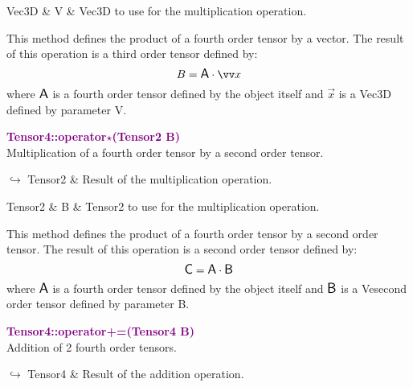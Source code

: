 \begin{tcolorbox}[width=\textwidth,myArgs,tabularx={ll|R}]
Vec3D & V & Vec3D to use for the multiplication operation.
\end{tcolorbox}

This method defines the product of a fourth order tensor by a vector.
The result of this operation is a third order tensor defined by:
\begin{equation*}
B = \A \cdot \overrightarrow{x}
\end{equation*}
where $\mbox{\large\ensuremath{\mathsf{A}}}$ is a fourth order tensor defined by the object itself and $\overrightarrow{x}$ is a Vec3D defined by parameter V.

\textcolor{purple}{\textbf{Tensor4::operator$\star$(Tensor2 B)}}\label{Tensor4::operator*(Tensor2 B)}\\
Multiplication of a fourth order tensor by a second order tensor.\vspace*{-0.5em}
\begin{tcolorbox}[grow to left by=-1cm, width=\textwidth-1cm,myArgs,tabularx={l|R}]
$\hookrightarrow$ Tensor2 & Result of the multiplication operation.
\end{tcolorbox}

\begin{tcolorbox}[width=\textwidth,myArgs,tabularx={ll|R}]
Tensor2 & B & Tensor2 to use for the multiplication operation.
\end{tcolorbox}

This method defines the product of a fourth order tensor by a second order tensor.
The result of this operation is a second order tensor defined by:
\begin{equation*}
\mbox{\large\ensuremath{\mathsf{C}}} = \mbox{\large\ensuremath{\mathsf{A}}} \cdot \mbox{\large\ensuremath{\mathsf{B}}}
\end{equation*}
where $\mbox{\large\ensuremath{\mathsf{A}}}$ is a fourth order tensor defined by the object itself and $\mbox{\large\ensuremath{\mathsf{B}}}$ is a Vesecond order tensor defined by parameter B.

\textcolor{purple}{\textbf{Tensor4::operator+=(Tensor4 B)}}\label{Tensor4::operator+=(Tensor4 B)}\\
Addition of 2 fourth order tensors.\vspace*{-0.5em}
\begin{tcolorbox}[grow to left by=-1cm, width=\textwidth-1cm,myArgs,tabularx={l|R}]
$\hookrightarrow$ Tensor4 & Result of the addition operation.
\end{tcolorbox}

